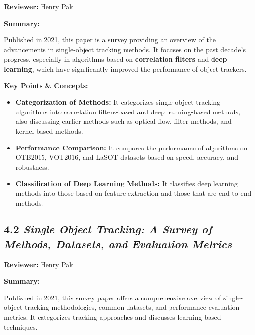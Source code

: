 \documentclass{article}
\begin{document}
\hspace*{\parindent}\textbf{Reviewer:} Henry Pak

\vspace{0.3cm}

\textbf{Summary:}

\vspace{0.3cm}

Published in 2021, this paper is a survey providing an overview of the advancements in single-object tracking methods. It focuses on the past decade's progress, especially in algorithms based on \textbf{correlation filters} and \textbf{deep learning}, which have significantly improved the performance of object trackers.

\vspace{0.3cm}

\textbf{Key Points \& Concepts:}
\begin{itemize}
  \item \textbf{Categorization of Methods:} It categorizes single-object tracking algorithms into correlation filters-based and deep learning-based methods, also discussing earlier methods such as optical flow, filter methods, and kernel-based methods.
  \item \textbf{Performance Comparison:} It compares the performance of algorithms on OTB2015, VOT2016, and LaSOT datasets based on speed, accuracy, and robustness.
  \item \textbf{Classification of Deep Learning Methods:} It classifies deep learning methods into those based on feature extraction and those that are end-to-end methods.
\end{itemize}

\subsection*{4.2 \textit{Single Object Tracking: A Survey of Methods, Datasets, and Evaluation Metrics}}

\hspace*{\parindent}\textbf{Reviewer:} Henry Pak

\vspace{0.3cm}

\textbf{Summary:}

\vspace{0.3cm}

Published in 2021, this survey paper offers a comprehensive overview of single-object tracking methodologies, common datasets, and performance evaluation metrics. It categorizes tracking approaches and discusses learning-based techniques.
\end{document}
